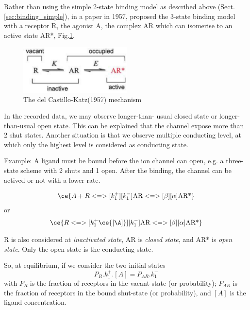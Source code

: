 Rather than using the simple 2-state binding model as described above
(Sect.\ref{sec:binding_simple}), in a paper in 1957, \citep{delCastillo1957}
proposed the 3-state binding model with a receptor R, the agonist A, the complex
AR which can isomerise to an active state AR*, Fig.\ref{fig:ligand_channel}.

\begin{figure}[hbt]
  \centerline{\includegraphics[height=2.5cm,
  angle=0]{./images/ligand_channel.eps}}
  \caption{The del Castillo-Katz(1957) mechanism}
  \label{fig:ligand_channel}
\end{figure}

\begin{mdframed}

In the recorded data, we may observe longer-than- usual closed state or
longer-than-usual open state. This can be explained that the channel expose more
than 2 shut states. Another situation is that we observe multiple conducting
level, at which only the highest level is considered as conducting state.
\end{mdframed}


Example: A ligand must be bound before the ion channel can
open, e.g. a three-state scheme with 2 shuts and 1 open. After the
binding, the channel can be actived or not with a lower rate.

\begin{equation}
  \label{eq:835}
  \ce{A + R <=>[k^+_1][k^-_1] \text{AR} <=>[\beta][\alpha] \text{AR*}}
\end{equation}
or
\begin{equation}
  \label{eq:835b}
  \ce{R <=>[k^+_1\ce{[\A]}][k^-_1] \text{AR} <=>[\beta][\alpha] \text{AR*} }
\end{equation}

R is also considered at {\it inactivated state}, AR is {\it closed state}, and
AR* is {\it open state}.  Only the open state is the conducting state.

So, at equilibrium, if we consider the two initial states
\begin{equation}
P_R . k^+_1 .[A] = P_{AR}.k^-_1
\end{equation}
with $P_R$ is the fraction of receptors in the vacant state (or probability);
$P_{AR}$ is the fraction of receptors in the bound shut-state (or probability),
and $[A]$ is the ligand concentration.

